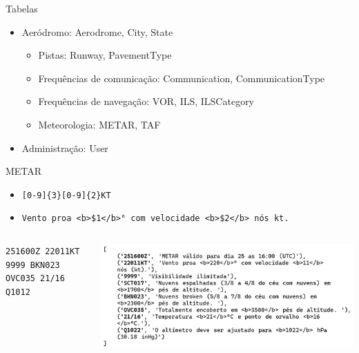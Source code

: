 \documentclass{beamer}
\begin{document}
\begin{frame}{Tabelas}
    \begin{itemize}
        \item Aeródromo: Aerodrome, City, State
        \begin{itemize}
            \item \small{Pistas:} Runway, PavementType
            \pause
            \item Frequências de comunicação: Communication, CommunicationType
            \item Frequências de navegação: VOR, ILS, ILSCategory
            \pause
            \item Meteorologia: METAR, TAF
        \end{itemize}
    \end{itemize}
    \pause
    \begin{itemize}
        \item Administração: User
    \end{itemize}
\end{frame}

\begin{frame}{METAR}
    \centering
    \begin{itemize}
        \item \texttt{[0-9]\{3\}[0-9]\{2\}KT}
        \item \texttt{Vento proa <b>\$1</b>° com velocidade <b>\$2</b> nós kt.}    
    \end{itemize}
    \begin{minipage}[b]{0.9\linewidth}
        \begin{columns}
            \begin{column}{0.4\textwidth}
                \tiny{\texttt{251600Z 22011KT 9999 BKN023 OVC035 21/16 Q1012}}
            \end{column}
            \begin{column}{0.6\textwidth}
                \includegraphics[width=\linewidth]{img/metar-dec.png}
            \end{column}
        \end{columns}
    \end{minipage}
\end{frame}
\end{document}
